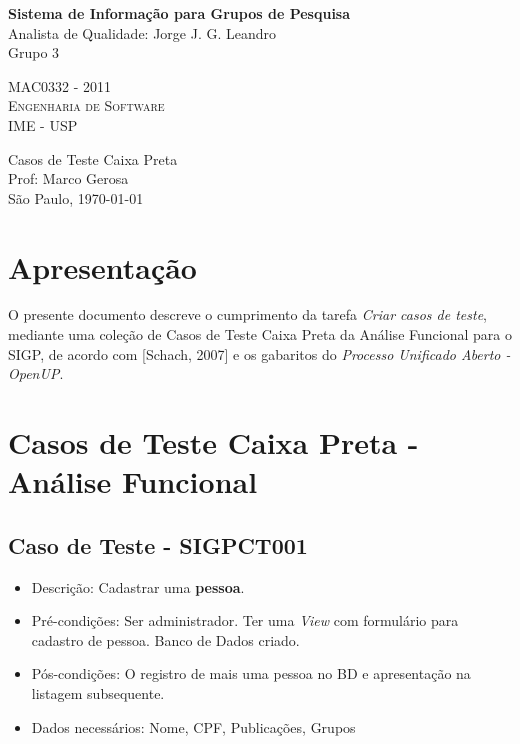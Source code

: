 \documentclass[11pt, a4paper]{book}
\begin{document}
\thispagestyle{empty}
\begin{center}
    \vspace*{0.2cm}
    \textbf{\Large{Sistema de Informação para Grupos de Pesquisa}}\\
	
    \vspace*{1.2cm}
    \Large{Analista de Qualidade: Jorge J. G. Leandro}\\
    \Large{Grupo 3}
    
    \vskip 2cm
	\textsc{
	MAC0332 - 2011\\[-0.25cm] 
          	Engenharia de Software\\[-0.25cm] 	
	IME - USP\\[-0.25cm]
	}
    
    \vskip 1.5cm
    Casos de Teste Caixa Preta\\
    Prof: Marco Gerosa\\

	
    \vskip 0.5cm
   {\normalsize São Paulo, \today}
\end{center}


\chapter[Apresentação]{Apresentação}
\label{cap:apresentacao}	
	
	 	O presente documento descreve o cumprimento da tarefa \emph{Criar casos de teste}, mediante uma coleção de Casos de Teste Caixa Preta da Análise Funcional para o SIGP, de acordo com [Schach, 2007] e os gabaritos do \emph{Processo Unificado Aberto - OpenUP}.

\chapter[Casos de Teste]{Casos de Teste Caixa Preta - Análise Funcional}
\label{cap:casosdeteste}

	\section{Caso de Teste - SIGPCT001 }
	\begin{itemize}
	\item Descrição: Cadastrar uma \textbf{pessoa}.
	\item Pré-condições: Ser administrador. Ter uma \emph{View} com formulário para cadastro de pessoa. Banco de Dados criado.
	\item Pós-condições: O registro de mais uma pessoa no BD e apresentação na listagem subsequente.
	\item Dados necessários: Nome, CPF, Publicações, Grupos
	\end{itemize}
\end{document}
